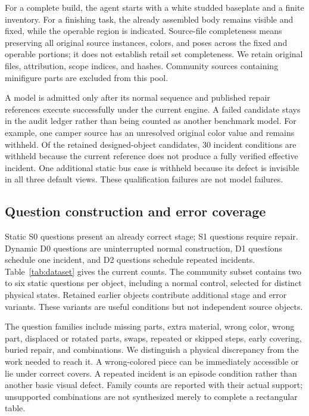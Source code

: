 \documentclass[10pt,twocolumn,letterpaper]{article}
\begin{document}
For a complete build, the agent starts with a white studded baseplate and a finite inventory. For a finishing task, the already assembled body remains visible and fixed, while the operable region is indicated. Source-file completeness means preserving all original source instances, colors, and poses across the fixed and operable portions; it does not establish retail set completeness. We retain original files, attribution, scope indices, and hashes. Community sources containing minifigure parts are excluded from this pool.

A model is admitted only after its normal sequence and published repair references execute successfully under the current engine. A failed candidate stays in the audit ledger rather than being counted as another benchmark model. For example, one camper source has an unresolved original color value and remains withheld. Of the retained designed-object candidates, 30 incident conditions are withheld because the current reference does not produce a fully verified effective incident. One additional static bus case is withheld because its defect is invisible in all three default views. These qualification failures are not model failures.



\subsection{Question construction and error coverage}
Static S0 questions present an already correct stage; S1 questions require repair. Dynamic D0 questions are uninterrupted normal construction, D1 questions schedule one incident, and D2 questions schedule repeated incidents. Table~\ref{tab:dataset} gives the current counts. The community subset contains two to six static questions per object, including a normal control, selected for distinct physical states. Retained earlier objects contribute additional stage and error variants. These variants are useful conditions but not independent source objects.

The question families include missing parts, extra material, wrong color, wrong part, displaced or rotated parts, swaps, repeated or skipped steps, early covering, buried repair, and combinations. We distinguish a physical discrepancy from the work needed to reach it. A wrong-colored piece can be immediately accessible or lie under correct covers. A repeated incident is an episode condition rather than another basic visual defect. Family counts are reported with their actual support; unsupported combinations are not synthesized merely to complete a rectangular table.
\end{document}
